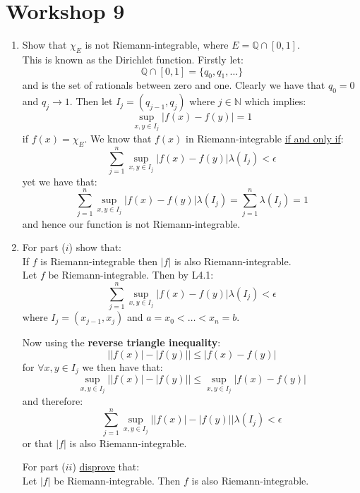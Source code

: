 \pagestyle{fancy}
\fancyhead{}

\section{Workshop 9}
\begin{enumerate}
    \item Show that $\displaystyle\chi_E$
    is not Riemann-integrable, where $E=\mathbb{Q}\cap[0,1]$. \\

    This is known as the Dirichlet function. Firstly let:
    $$\mathbb{Q}\cap[0,1]=\{q_0,q_1,\dots\}$$
    and is the set of rationals between zero and one.
    Clearly we have that $q_0=0$ and $q_j\rightarrow1$.
    Then let $I_j=(q_{j-1},q_j)$ where $j\in\mathbb{N}$
    which implies:
    $$\sup_{x,y\in I_j}|f(x)-f(y)|=1$$
    if $f(x)=\chi_E$. We know that $f(x)$ in Riemann-integrable
    \underline{if and only if}:
    $$\sum_{j=1}^{n}\sup_{x,y\in I_j}|f(x)-f(y)|
    \lambda(I_j)<\epsilon$$
    yet we have that:
    $$\sum_{j=1}^{n}\sup_{x,y\in I_j}|f(x)-f(y)|
    \lambda(I_j)
    =\sum_{j=1}^{n}\lambda(I_j)=1$$
    and hence our function is not Riemann-integrable. \\

    \item For part ($i$) show that: \\
    If $f$ is Riemann-integrable
    then $|f|$ is also Riemann-integrable. \\

    Let $f$ be Riemann-integrable. Then by L4.1:
    $$\sum_{j=1}^{n}\sup_{x,y\in I_j}
    |f(x)-f(y)|\lambda(I_j)<\epsilon$$
    where $I_j=(x_{j-1},x_j)$
    and $a=x_0<\dots<x_n=b$.

    Now using the \textbf{reverse triangle inequality}:
    $$\bigl||f(x)|-|f(y)|\bigr|\leq|f(x)-f(y)|$$
    for $\forall x,y\in I_j$ we then have that:
    $$\sup_{x,y\in I_j}\bigl||f(x)|-|f(y)|\bigr|
    \leq\sup_{x,y\in I_j}|f(x)-f(y)|$$
    and therefore:
    $$\sum_{j=1}^{n}\sup_{x,y\in I_j}
    \bigl||f(x)|-|f(y)|\bigr|\lambda(I_j)<\epsilon$$
    or that $|f|$ is also Riemann-integrable.

    \newpage

    For part ($ii$) \underline{disprove} that: \\
    Let $|f|$ be Riemann-integrable. Then
    $f$ is also Riemann-integrable. \\


\end{enumerate}
